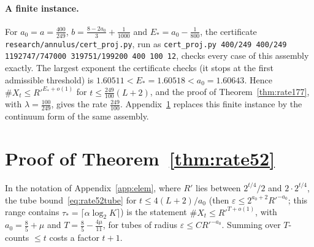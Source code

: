 \documentclass[aps,prx,twocolumn,superscriptaddress,nofootinbib,longbibliography]{revtex4-2}
\theoremstyle{plain}
\theoremstyle{definition}
\theoremstyle{remark}
\begin{document}
\paragraph{A finite instance.} For $a_0=a=\tfrac{400}{249}$, $b=\tfrac{8-2a_0}3+\tfrac1{1000}$ and $E_*=a_0-\tfrac1{800}$, the certificate \texttt{research/annulus/cert\_proj.py}, run as \texttt{cert\_proj.py 400/249 400/249 1192747/747000 319751/199200 400 100 12}, checks every case of this assembly exactly. The largest exponent the certificate checks (it stops at the first admissible threshold) is $1.60511<E_*=1.60518<a_0=1.60643$. Hence $\#X_t\le R'^{E_*+o(1)}$ for $t\le\tfrac{249}{100}(L+2)$, and the proof of Theorem~\ref{thm:rate177}, with $\lambda=\tfrac{100}{249}$, gives the rate $\tfrac{249}{100}$. Appendix~\ref{app:rate52} replaces this finite instance by the continuum form of the same assembly.

\section{Proof of Theorem~\ref{thm:rate52}}\label{app:rate52}

In the notation of Appendix~\ref{app:elem}, where $R'$ lies between $2^{t/4}/2$ and $2\cdot2^{t/4}$, the tube bound~\eqref{eq:rate52tube} for $t\le4(L+2)/a_0$ (then $\varepsilon\le2^{a_0+2}R'^{-a_0}$; this range contains $\tau_*=\lceil\alpha\log_2K\rceil$) is the statement $\#X_t\le R'^{T+o(1)}$, with $a_0=\tfrac85+\mu$ and $T=\tfrac85-\tfrac{4\mu}{11}$, for tubes of radius $\varepsilon\le CR'^{-a_0}$. Summing over $T$-counts $\le t$ costs a factor $t+1$.
\end{document}
